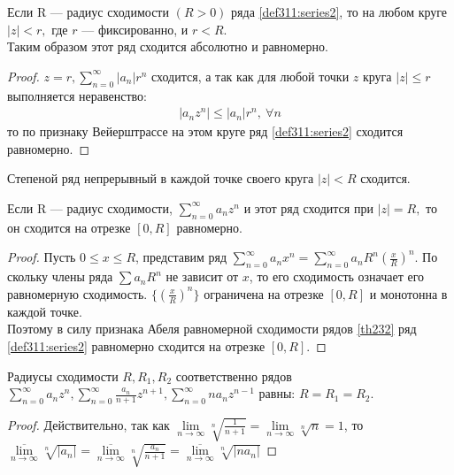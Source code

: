 \begin{theorem}
  \label{th312}
  Если R --- радиус сходимости $(R > 0)$ ряда \eqref{def311:series2}, то на любом
  круге $|z| < r, $ где $r$ --- фиксированно, и $r < R$. \\
  Таким образом этот ряд сходится абсолютно и равномерно.
\end{theorem}

\begin{proof}
  $z = r, \sum\limits_{n = 0}^{\infty} |a_n| r^n$ сходится, а так как для любой
  точки $z$ круга $|z| \leq r$ выполняется неравенство:
  \begin{gather*}
    |a_n z^n| \leq |a_n| r^n, \ \forall n
  \end{gather*}
  то по признаку Вейерштрассе на этом круге ряд \eqref{def311:series2} сходится
  равномерно.
\end{proof}

\begin{consequence}
  Степеной ряд непрерывный в каждой точке своего круга $|z| < R$ сходится.
\end{consequence}

\begin{theorem}[2-ая т. Абеля]
  \label{th313}
  Если R --- радиус сходимости, $\sum\limits_{n = 0}^{\infty} a_n z^n$ и этот
  ряд сходится при $|z| = R,$ то он сходится на отрезке $[0, R]$ равномерно.
\end{theorem}

\begin{proof}
  Пусть $0 \leq x \leq R$, представим ряд $\sum\limits_{n = 0}^{\infty} a_n x^n
  = \sum\limits_{n = 0}^{\infty} a_n R^n\left(\frac{x}{R}\right)^n$. По скольку
  члены ряда $\sum a_n R^n$ не зависит от $x$, то его сходимость означает его
  равномерную сходимость. $\{(\frac{x}{R})^n\}$ ограничена на отрезке $[0, R]$
  и монотонна в каждой точке. \\
  Поэтому в силу признака Абеля равномерной сходимости рядов \eqref{th232} ряд
  \eqref{def311:series2} равномерно сходится на отрезке $[0, R]$.
\end{proof}

\begin{lemma}
  \label{ch3:lemma1}
  Радиусы сходимости $R, R_1, R_2$ соответственно рядов
  $\sum\limits_{n = 0}^{\infty} a_n z^n, \sum\limits_{n = 0}^{\infty}
  \frac{a_n}{n + 1} z^{n+1}, \sum\limits_{n = 0}^{\infty} n a_n z^{n - 1}$ равны:
  $R = R_1 = R_2$.
\end{lemma}

\begin{proof}
  Действительно, так как $\lim\limits_{n \to \infty} \sqrt[n]{\frac{1}{n + 1}}=
  \lim\limits_{n \to \infty} \sqrt[n]{n} = 1$, то \\
  $\overline{\lim\limits_{n \to \infty}} \sqrt[n]{|a_n|} =
  \overline{\lim\limits_{n \to \infty}} \sqrt[n]{\frac{a_n}{n + 1}}=
  \overline{\lim\limits_{n \to \infty}} \sqrt[n]{|n a_n|}$
\end{proof}

